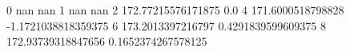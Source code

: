 0 nan nan
1 nan nan
2 172.77215576171875 0.0
4 171.6000518798828 -1.1721038818359375
6 173.2013397216797 0.4291839599609375
8 172.93739318847656 0.1652374267578125
